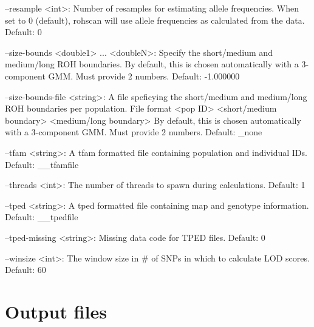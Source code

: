 \documentclass[titlepage,12pt] {article}
\begin{document}
--resample <int>: Number of resamples for estimating allele frequencies.
	When set to 0 (default), rohscan will use allele
	frequencies as calculated from the data.
	Default: 0

--size-bounds <double1> ... <doubleN>: Specify the short/medium and medium/long
	ROH boundaries.  By default, this is chosen automatically
	with a 3-component GMM.  Must provide 2 numbers.
	Default: -1.000000

--size-bounds-file <string>: A file speficying the short/medium and medium/long
	ROH boundaries per population.
	File format <pop ID> <short/medium boundary> <medium/long boundary>
	By default, this is chosen automatically
	with a 3-component GMM.  Must provide 2 numbers.
	Default: _none

--tfam <string>: A tfam formatted file containing population and individual IDs.
	Default: __tfamfile

--threads <int>: The number of threads to spawn during calculations.
	Default: 1

--tped <string>: A tped formatted file containing map and genotype information.
	Default: __tpedfile

--tped-missing <string>: Missing data code for TPED files.
	Default: 0

--winsize <int>: The window size in # of SNPs in which to calculate LOD scores.
	Default: 60


\section{Output files}
\label{sec:outfile}
\end{document}
